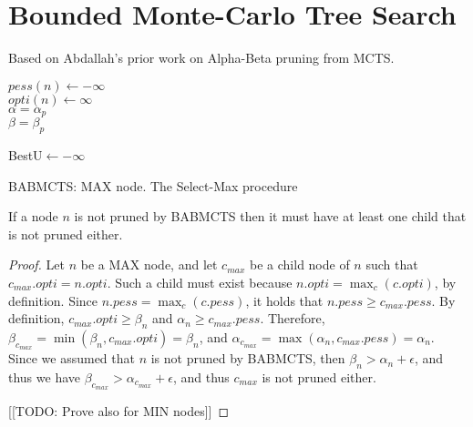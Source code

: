 \section{Bounded Monte-Carlo Tree Search}

Based on Abdallah's prior work on Alpha-Beta pruning from MCTS.

\begin{algorithm}

$pess(n)\gets -\infty$\\
$opti(n)\gets \infty$\\
$\alpha = \alpha_p$\\
$\beta = \beta_p$\\

BestU$\gets -\infty$\\
\caption{BABMCTS: MAX node. The Select-Max procedure}
\label{alg:weightedAlphaBetaMCTS}
\end{algorithm}



\begin{lemma}
If a node $n$ is not pruned by BABMCTS then it must have at least one child that is not pruned either. 
\end{lemma}
\begin{proof}
Let $n$ be a MAX node, and let $c_{max}$ be a child node of $n$ such that 
$c_{max}.opti=n.opti$. Such a child must exist because $n.opti=\max_c (c.opti)$, by definition. 
Since $n.pess=\max_c(c.pess)$, it holds that $n.pess\geq c_{max}.pess$. 
By definition, $c_{max}.opti\geq \beta_n$ and $\alpha_n\geq c_{max}.pess$. 
Therefore, $\beta_{c_{max}}=\min(\beta_n,c_{max}.opti)=\beta_n$, 
and $\alpha_{c_{max}}=\max(\alpha_n, c_{max}.pess)=\alpha_n$. 
Since we assumed that $n$ is not pruned by BABMCTS, then 
$\beta_n> \alpha_n+\epsilon$, and thus we have
$\beta_{c_{max}}>\alpha_{c_{max}}+\epsilon$, and thus $c_{max}$ is not pruned either. 

[[TODO: Prove also for MIN nodes]]

\end{proof}



